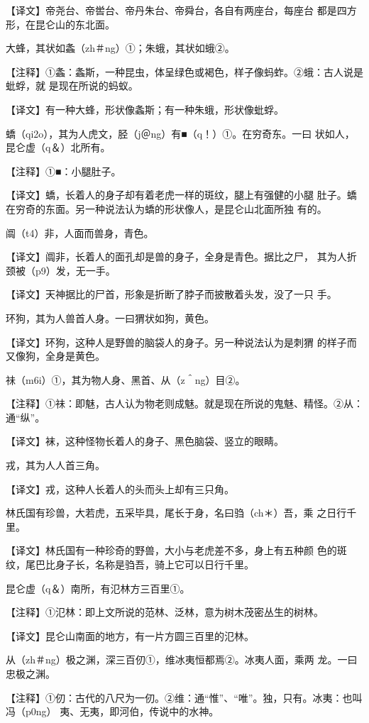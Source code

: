 \documentclass[a4paper,12pt,UTF8,twoside]{ctexbook}
\begin{document}
【译文】帝尧台、帝喾台、帝丹朱台、帝舜台，各自有两座台，每座台 都是四方形，在昆仑山的东北面。

大蜂，其状如螽（zh＃ng）①；朱蛾，其状如蛾②。

【注释】①螽：螽斯，一种昆虫，体呈绿色或褐色，样子像蚂蚱。②蛾：古人说是蚍蜉，就 是现在所说的蚂蚁。

【译文】有一种大蜂，形状像螽斯；有一种朱蛾，形状像蚍蜉。

蟜（qi2o），其为人虎文，胫（j＠ng）有■（q！）①。在穷奇东。一曰 状如人，昆仑虚（q＆）北所有。

【注释】①■：小腿肚子。

【译文】蟜，长着人的身子却有着老虎一样的斑纹，腿上有强健的小腿 肚子。蟜在穷奇的东面。另一种说法认为蟜的形状像人，是昆仑山北面所独 有的。

阘（t4）非，人面而兽身，青色。

【译文】阘非，长着人的面孔却是兽的身子，全身是青色。据比之尸， 其为人折颈被（p9）发，无一手。

【译文】天神据比的尸首，形象是折断了脖子而披散着头发，没了一只 手。

环狗，其为人兽首人身。一曰猬状如狗，黄色。

【译文】环狗，这种人是野兽的脑袋人的身子。另一种说法认为是刺猬 的样子而又像狗，全身是黄色。

祙（m6i）①，其为物人身、黑首、从（z＾ng）目②。

【注释】①祙：即魅，古人认为物老则成魅。就是现在所说的鬼魅、精怪。②从：通“纵”。

【译文】袜，这种怪物长着人的身子、黑色脑袋、竖立的眼睛。

戎，其为人人首三角。

【译文】戎，这种人长着人的头而头上却有三只角。

林氏国有珍兽，大若虎，五采毕具，尾长于身，名曰驺（ch＊）吾，乘 之日行千里。

【译文】林氏国有一种珍奇的野兽，大小与老虎差不多，身上有五种颜 色的斑纹，尾巴比身子长，名称是驺吾，骑上它可以日行千里。

昆仑虚（q＆）南所，有氾林方三百里①。

【注释】①氾林：即上文所说的范林、泛林，意为树木茂密丛生的树林。

【译文】昆仑山南面的地方，有一片方圆三百里的氾林。

从（zh＃ng）极之渊，深三百仞①，维冰夷恒都焉②。冰夷人面，乘两 龙。一曰忠极之渊。

【注释】①仞：古代的八尺为一仞。②维：通“惟”、“唯”。独，只有。冰夷：也叫冯（p0ng） 夷、无夷，即河伯，传说中的水神。
\end{document}
